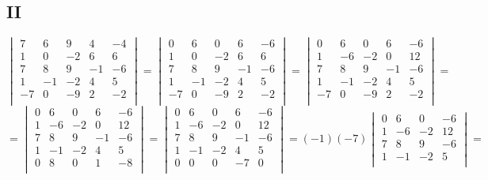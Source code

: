 \documentclass{article}
\begin{document}
\subsection*{II}
$$
\begin{vmatrix}
7 & 6 & 9 & 4 & -4 \\
1 & 0 & -2 & 6 & 6 \\
7 & 8 & 9 & -1 & -6 \\
1 & -1 & -2 & 4 & 5 \\
-7 & 0 & -9 & 2 & -2 \\
\end{vmatrix} = 
\begin{vmatrix}
0 & 6 & 0 & 6 & -6 \\
1 & 0 & -2 & 6 & 6 \\
7 & 8 & 9 & -1 & -6 \\
1 & -1 & -2 & 4 & 5 \\
-7 & 0 & -9 & 2 & -2 \\
\end{vmatrix} = 
\begin{vmatrix}
0 & 6 & 0 & 6 & -6 \\
1 & -6 & -2 & 0 & 12 \\
7 & 8 & 9 & -1 & -6 \\
1 & -1 & -2 & 4 & 5 \\
-7 & 0 & -9 & 2 & -2 \\
\end{vmatrix} = 
$$
$$
=
\begin{vmatrix}
0 & 6 & 0 & 6 & -6 \\
1 & -6 & -2 & 0 & 12 \\
7 & 8 & 9 & -1 & -6 \\
1 & -1 & -2 & 4 & 5 \\
0 & 8 & 0 & 1 & -8 \\
\end{vmatrix} = 
\begin{vmatrix}
0 & 6 & 0 & 6 & -6 \\
1 & -6 & -2 & 0 & 12 \\
7 & 8 & 9 & -1 & -6 \\
1 & -1 & -2 & 4 & 5 \\
0 & 0 & 0 & -7 & 0 \\
\end{vmatrix} = 
(-1)(-7)
\begin{vmatrix}
0 & 6 & 0 & -6 \\
1 & -6 & -2 &  12 \\
7 & 8 & 9 & -6 \\
1 & -1 & -2 &  5 \\
\end{vmatrix} = 
$$
\end{document}

